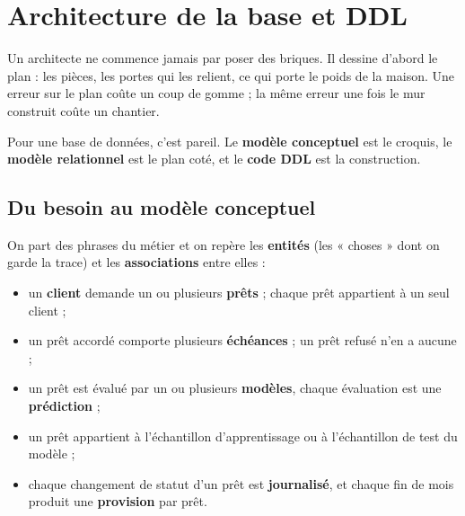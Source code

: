\chapter{Architecture de la base et DDL}


\begin{imagine}
Un architecte ne commence jamais par poser des briques. Il dessine d'abord le plan : les pièces, les
portes qui les relient, ce qui porte le poids de la maison. Une erreur sur le plan coûte un coup de
gomme ; la même erreur une fois le mur construit coûte un chantier.

Pour une base de données, c'est pareil. Le \textbf{modèle conceptuel} est le croquis, le
\textbf{modèle relationnel} est le plan coté, et le \textbf{code DDL} est la construction.
\end{imagine}

\section{Du besoin au modèle conceptuel}

On part des phrases du métier et on repère les \textbf{entités} (les « choses » dont on garde la trace)
et les \textbf{associations} entre elles :
\begin{itemize}
\item un \textbf{client} demande un ou plusieurs \textbf{prêts} ; chaque prêt appartient à un seul client ;
\item un prêt accordé comporte plusieurs \textbf{échéances} ; un prêt refusé n'en a aucune ;
\item un prêt est évalué par un ou plusieurs \textbf{modèles}, chaque évaluation est une \textbf{prédiction} ;
\item un prêt appartient à l'échantillon d'apprentissage ou à l'échantillon de test du modèle ;
\item chaque changement de statut d'un prêt est \textbf{journalisé}, et chaque fin de mois produit une
\textbf{provision} par prêt.
\end{itemize}

